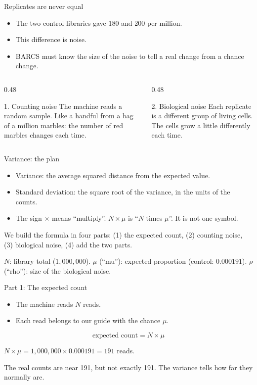 \documentclass[aspectratio=169,11pt]{beamer}
\begin{document}
\begin{frame}{Replicates are never equal}
\begin{itemize}
\item The two control libraries gave 180 and 200 per million.
\item This difference is \alert{noise}.
\item BARCS must know the size of the noise to tell a real change from a
  chance change.
\end{itemize}
\medskip
\begin{columns}[T]
\begin{column}{0.48\textwidth}
\begin{block}{1. Counting noise}
The machine reads a random sample. Like a handful from a bag of a million
marbles: the number of red marbles changes each time.
\end{block}
\end{column}
\begin{column}{0.48\textwidth}
\begin{block}{2. Biological noise}
Each replicate is a different group of living cells. The cells grow a
little differently each time.
\end{block}
\end{column}
\end{columns}
\end{frame}

\begin{frame}{Variance: the plan}
\begin{itemize}
\item \alert{Variance}: the average squared distance from the expected
  value.
\item \alert{Standard deviation}: the square root of the variance, in the
  units of the counts.
\item The sign $\times$ means ``multiply''. $N \times \mu$ is ``$N$ times
  $\mu$''. It is \alert{not} one symbol.
\end{itemize}
\medskip
We build the formula in four parts: (1) the expected count, (2) counting
noise, (3) biological noise, (4) add the two parts.
\medskip
\begin{symbols}
\small
$N$: library total ($1{,}000{,}000$).\quad
$\mu$ (``mu''): expected proportion (control: $0.000191$).\quad
$\rho$ (``rho''): size of the biological noise.
\end{symbols}
\end{frame}

\begin{frame}{Part 1: The expected count}
\begin{itemize}
\item The machine reads $N$ reads.
\item Each read belongs to our guide with the chance $\mu$.
\end{itemize}
\[
\text{expected count} = N \times \mu
\]
\begin{worked}[ 4a]
$N \times \mu = 1{,}000{,}000 \times 0.000191 = 191$ reads.

The real counts are near 191, but not exactly 191. The variance tells how
far they normally are.
\end{worked}
\end{frame}
\end{document}
